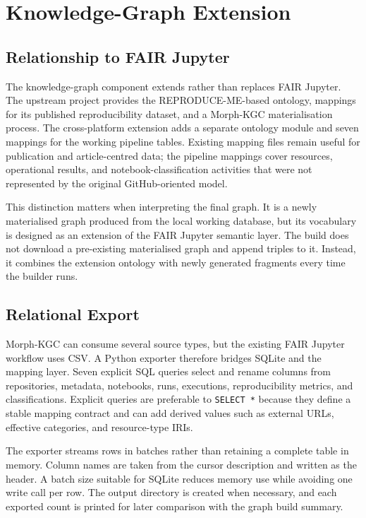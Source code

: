 \chapter{Knowledge-Graph Extension}
\label{chap:kg}

\section{Relationship to FAIR Jupyter}

The knowledge-graph component extends rather than replaces FAIR Jupyter. The upstream project provides the REPRODUCE-ME-based ontology, mappings for its published reproducibility dataset, and a Morph-KGC materialisation process. The cross-platform extension adds a separate ontology module and seven mappings for the working pipeline tables. Existing mapping files remain useful for publication and article-centred data; the pipeline mappings cover resources, operational results, and notebook-classification activities that were not represented by the original GitHub-oriented model.

This distinction matters when interpreting the final graph. It is a newly materialised graph produced from the local working database, but its vocabulary is designed as an extension of the FAIR Jupyter semantic layer. The build does not download a pre-existing materialised graph and append triples to it. Instead, it combines the extension ontology with newly generated fragments every time the builder runs.

\section{Relational Export}

Morph-KGC can consume several source types, but the existing FAIR Jupyter workflow uses CSV. A Python exporter therefore bridges SQLite and the mapping layer. Seven explicit SQL queries select and rename columns from repositories, metadata, notebooks, runs, executions, reproducibility metrics, and classifications. Explicit queries are preferable to \texttt{SELECT *} because they define a stable mapping contract and can add derived values such as external URLs, effective categories, and resource-type IRIs.

The exporter streams rows in batches rather than retaining a complete table in memory. Column names are taken from the cursor description and written as the header. A batch size suitable for SQLite reduces memory use while avoiding one write call per row. The output directory is created when necessary, and each exported count is printed for later comparison with the graph build summary.

